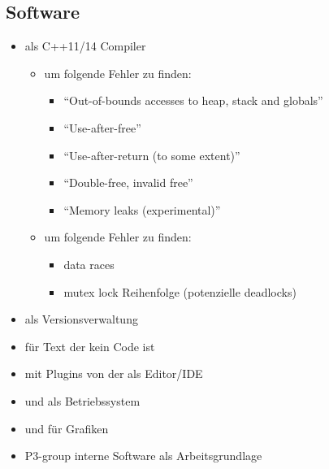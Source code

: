   \subsection{Software}
  \label{ssec:software}
    \begin{itemize}
      \item {} als C++11/14 Compiler
        \begin{itemize}
          \item {} um folgende Fehler zu finden:
            \begin{itemize}
              \item ``Out-of-bounds accesses to heap, stack and globals''
              \item ``Use-after-free''
              \item ``Use-after-return (to some extent)''
              \item ``Double-free, invalid free''
              \item ``Memory leaks (experimental)''
            \end{itemize}
          \item {} um folgende Fehler zu finden:
            \begin{itemize}
              \item data races
              \item mutex lock Reihenfolge (potenzielle deadlocks)
             \end{itemize}
        \end{itemize}
      \item {} als Versionsverwaltung
      \item {} für Text der kein Code ist
      \item {} mit Plugins von der  als Editor/IDE
      \item {} und  als Betriebssystem
      \item {} und  für Grafiken
      \item P3-group interne Software als Arbeitsgrundlage
    \end{itemize}

